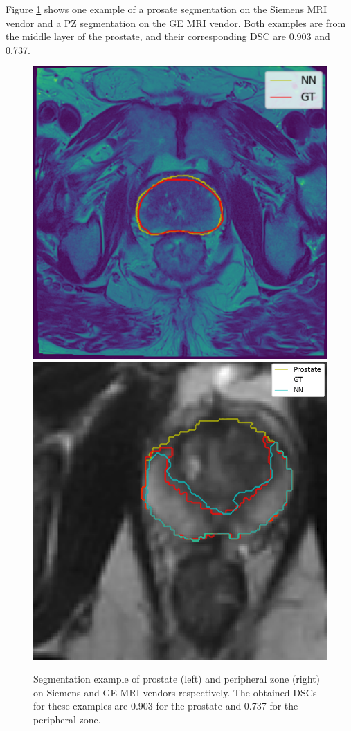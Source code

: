 Figure \ref{fig:resseg} shows one example of a prosate segmentation on the Siemens MRI vendor and a PZ segmentation on the GE MRI vendor. Both examples are from the middle layer of the prostate, and their corresponding DSC are 0.903 and 0.737.
\begin{figure}[h]
    \centering
    \includegraphics[totalheight=.18\textheight]{imgs/results/prosate.png}
    \includegraphics[totalheight=.18\textheight]{imgs/results/pz.png}
    \caption{Segmentation example of prostate (left) and peripheral zone (right) on Siemens and GE MRI vendors respectively. The obtained DSCs for these examples are 0.903 for the prostate and 0.737 for the peripheral zone.}
    \label{fig:resseg}
\end{figure}
